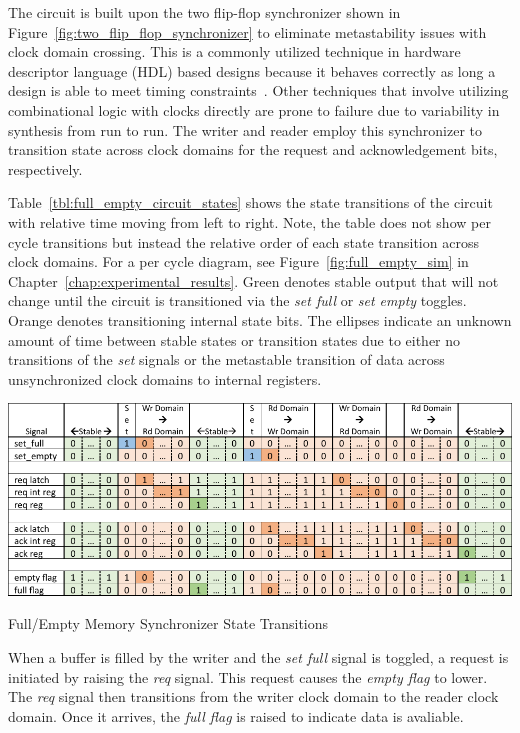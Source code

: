         The circuit is built upon the two flip-flop synchronizer shown in Figure~\ref{fig:two_flip_flop_synchronizer} to eliminate metastability issues with clock domain crossing. This is a commonly utilized technique in hardware descriptor language (HDL) based designs because it behaves correctly as long a design is able to meet timing constraints~\cite{Cummings2008, Ginosar2011}. Other techniques that involve utilizing combinational logic with clocks directly are prone to failure due to variability in synthesis from run to run. The writer and reader employ this synchronizer to transition state across clock domains for the request and acknowledgement bits, respectively.

        Table~\ref{tbl:full_empty_circuit_states} shows the state transitions of the circuit with relative time moving from left to right. Note, the table does not show per cycle transitions but instead the relative order of each state transition across clock domains. For a per cycle diagram, see Figure~\ref{fig:full_empty_sim} in Chapter~\ref{chap:experimental_results}. Green denotes stable output that will not change until the circuit is transitioned via the {\it set full} or {\it set empty} toggles. Orange denotes transitioning internal state bits. The ellipses indicate an unknown amount of time between stable states or transition states due to either no transitions of the {\it set} signals or the metastable transition of data across unsynchronized clock domains to internal registers.

        \begin{table}
            \centering
            \includegraphics[width=1.0\textwidth]{fig/full_empty_circuit_states.pdf}
            \caption{Full/Empty Memory Synchronizer State Transitions}
            \label{tbl:full_empty_circuit_states}
        \end{table}

        When a buffer is filled by the writer and the {\it set full} signal is toggled, a request is initiated by raising the {\it req} signal. This request causes the {\it empty flag} to lower. The {\it req} signal then transitions from the writer clock domain to the reader clock domain. Once it arrives, the {\it full flag} is raised to indicate data is avaliable.

